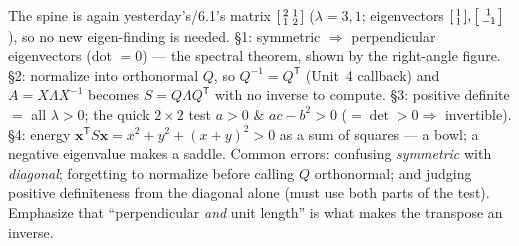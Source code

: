 \documentclass[10pt]{article}
\newcommand{\xx}{\mathbf{x}}
\newcommand{\T}{\mathsf{T}}
\begin{document}
\begin{teachernote}
The spine is again yesterday's/6.1's matrix $\begin{bsmallmatrix}2&1\\1&2\end{bsmallmatrix}$ ($\lambda=3,1$;
eigenvectors $\begin{bsmallmatrix}1\\1\end{bsmallmatrix},\begin{bsmallmatrix}1\\-1\end{bsmallmatrix}$), so no
new eigen-finding is needed. §1: symmetric $\Rightarrow$ perpendicular eigenvectors (dot $=0$) --- the
spectral theorem, shown by the right-angle figure. §2: normalize into orthonormal $Q$, so $Q^{-1}=Q^{\T}$
(Unit~4 callback) and $A=X\Lambda X^{-1}$ becomes $S=Q\Lambda Q^{\T}$ with no inverse to compute. §3:
positive definite $=$ all $\lambda>0$; the quick $2\times2$ test $a>0$ \& $ac-b^2>0$ ($=\det>0\Rightarrow$
invertible). §4: energy $\xx^{\T}S\xx=x^2+y^2+(x+y)^2>0$ as a sum of squares --- a bowl; a negative
eigenvalue makes a saddle. Common errors: confusing \emph{symmetric} with \emph{diagonal}; forgetting to
normalize before calling $Q$ orthonormal; and judging positive definiteness from the diagonal alone (must
use both parts of the test). Emphasize that ``perpendicular \emph{and} unit length'' is what makes the
transpose an inverse.
\end{teachernote}
\end{document}
